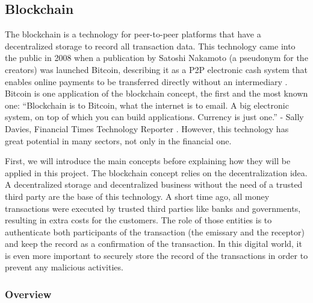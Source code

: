 \subsection{Blockchain}

The blockchain is a technology for peer-to-peer platforms that have a decentralized storage to record all transaction data. This technology came into the public in 2008  when a publication by Satoshi Nakamoto (a pseudonym for the creators) was launched Bitcoin, describing it as a \ac{P2P} electronic cash system that enables online payments to be transferred directly without an intermediary \cite{bitcoin}. Bitcoin is one application of the blockchain concept, the first and the most known one:  “Blockchain is to Bitcoin, what the internet is to email. A big electronic system, on top of which you can build applications. Currency is just one.” - Sally Davies, Financial Times Technology Reporter \cite{Howbitcoinanditsblockchainwork}. However, this technology has great potential in many sectors, not only in the financial one.


First, we will introduce the main concepts before explaining how they will be applied in this project. The blockchain concept relies on the decentralization idea. A decentralized storage and decentralized business without the need of a trusted third party are the base of this technology. A short time ago, all money transactions were executed by trusted third parties like banks and governments, resulting in extra costs for the customers. The role of those entities is to authenticate both participants of the transaction (the emissary and the receptor) and keep the record as a confirmation of the transaction. In this digital world, it is even more important to securely store the record of the transactions in order to prevent any malicious activities. 



\subsubsection{Overview}



